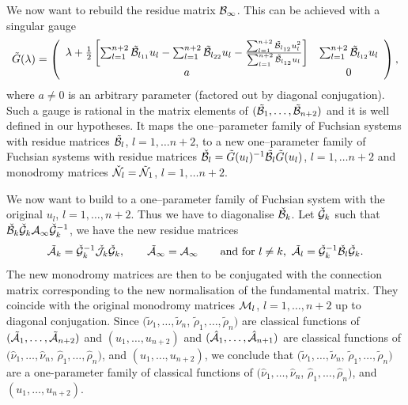 \documentclass[12pt]{article}
\theoremstyle{definition}
\theoremstyle{theorem}
\begin{document}
We now want to rebuild the residue matrix ${\cal B}_\infty$. This 
can be achieved with a singular gauge
$$
\tilde G(\lambda)=\left(\begin{array}{cc}
\lambda+{1\over 2}\left[\sum_{l=1}^{n+2}\tilde{\cal B}_{l_{11}} u_l
-\sum_{l=1}^{n+2}\tilde{\cal B}_{l_{22}} u_l - 
{\sum_{l=1}^{n+2}\tilde{\cal B}_{l_{12}} u_l^2\over 
\sum_{l=1}^{n+2}\tilde{\cal B}_{l_{12}} u_l} \right] &
\sum_{l=1}^{n+2}\tilde{\cal B}_{l_{12}} u_l\\
a &0\\ \end{array}\right),
$$
where $a\neq 0$ is an arbitrary parameter (factored out by diagonal 
conjugation). Such a gauge is rational in
the matrix elements of $(\tilde{\cal B}_1,\dots,\tilde{\cal B}_{n+2})$ 
and it is well defined in our hypotheses. It maps the one--parameter
family of Fuchsian systems with residue matrices $\tilde{\cal B}_l$, 
$l=1,\dots n+2$, to a new one--parameter family of Fuchsian systems 
with residue matrices 
$\check{\cal B}_l=\tilde G(u_l)^{-1}\tilde{\cal B}_l\tilde G(u_l)$, 
$l=1,\dots n+2$ and monodromy matrices 
$\check{\cal N}_l=\tilde{\cal N}_1$, $l=1,\dots n+2$.

We now want to  build to a one--parameter family of Fuchsian 
system with the original $u_l$, $l=1,\dots,n+2$. Thus we have to 
diagonalise $\check{\cal B}_k$. Let $\check{\cal G}_k$ such that
$\check{\cal B}_k\check{\cal G}_k{\cal A}_{\infty}
\check{\cal G}_k^{-1}$, we have the new residue matrices
$$
\tilde{\cal A}_{k} = 
\check{\cal G}_k^{-1}\check{\cal J}_k\check{\cal G}_k,\qquad
\tilde{\cal A}_{\infty} = {\cal A}_{\infty}
\qquad \hbox{and for $l\neq k$, }\, 
\tilde{\cal A}_{l} = 
\check{\cal G}_k^{-1}\check{\cal B}_l\check{\cal G}_k.
$$
The new monodromy matrices are then to be conjugated with the 
connection matrix corresponding to the new normalisation of the 
fundamental matrix. They coincide with the original monodromy matrices
${\cal M}_l$, $l=1,\dots,n+2$ up to diagonal conjugation. Since
$(\tilde\nu_1,\dots,\tilde\nu_n$, $\tilde\rho_1,\dots,\tilde\rho_n)$ 
are classical functions of 
$(\tilde{\cal A}_1,\dots,\tilde{\cal A}_{n+2})$ and  
$(u_1,\dots,u_{n+2})$ and 
$(\hat{\cal A}_1,\dots,\hat{\cal A}_{n+1})$ are classical
functions of 
$(\hat\nu_1,\dots,\hat\nu_n$, $\hat\rho_1,\dots,\hat\rho_n)$,
and $(u_1,\dots,u_{n+2})$, we conclude that 
$(\tilde\nu_1,\dots,\tilde\nu_n$, $\tilde\rho_1,\dots,\tilde\rho_n)$ 
are a one-parameter family of classical functions of
$(\hat\nu_1,\dots,\hat\nu_n$, $\hat\rho_1,\dots,\hat\rho_n)$,
and $(u_1,\dots,u_{n+2})$.
\end{document}
